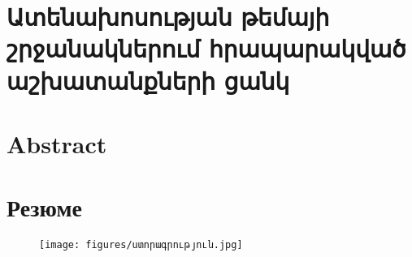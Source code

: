 \documentclass[a5paper,9pt,final]{extarticle}
\begin{document}
\section*{Ատենախոսության թեմայի շրջանակներում հրապարակված աշխատանքների ցանկ}


\pagebreak
\section*{Abstract}

\pagebreak
\section*{Резюме}


\begin{figure}[b]
\centering
\texttt{[image: figures/ստորագրություն.jpg]}
\end{figure}


% 
\end{document}
